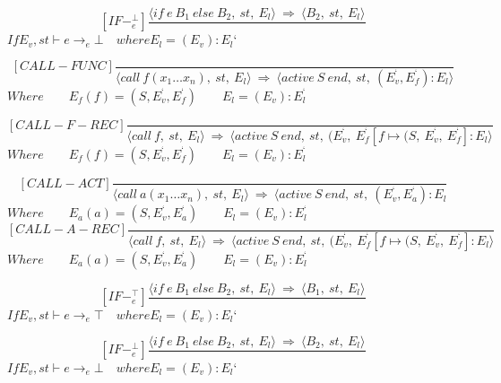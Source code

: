 	\[
	[IF-^{\bot}_e]
	\dfrac{\langle if \ e \ B_1 \ else \ B_2, \ st, \ E_l \rangle \ \Rightarrow \ \langle B_2, \ st, \ E_l \rangle}{}
	\]
	\begin{math}
		If E_v, st \vdash e \rightarrow_e \bot \quad where E_l = (E_v) : E_l{‘}
	\end{math}
	
	\[
	[CALL-FUNC]
	\dfrac{}{ \langle call \ f(x_1 … x_n), \ st, \ E_l \rangle \ \Rightarrow \ \langle active \ S \ end, \ st, \ (E_v^{‘}, E_f^{‘}) : E_l \rangle}
	\]
	\begin{math}
		Where 
		\qquad E_f(f) = (S, E_v^{‘}, E_f^{‘})
		\qquad E_l = (E_v) : E_l^{‘}
	\end{math}
	
	\[
	[CALL-F-REC]
	\dfrac{}{ \langle call \ f, \ st, \ E_l \rangle \ \Rightarrow \ \langle active \ S \ end, \ st, \ (E_v^{‘}, \ E_f^{‘}[f \mapsto (S, \ E_v^{‘}, \ E_f^{‘}] : E_l \rangle}
	\]
	\begin{math}
		Where
		\qquad E_f(f) = (S, E_v^{‘}, E_f^{‘}) 
		\qquad E_l = (E_v) : E_l^{‘}
	\end{math}
	
	\[
	[CALL-ACT]
	\dfrac{}{ \langle call \ a(x_1 … x_n), \ st, \ E_l \rangle \ \Rightarrow \ \langle active \ S \ end, \ st, \ (E_v^{‘}, E_a^{‘}) : E_l}
	\]
	\begin{math}
		Where
		\qquad E_a(a) = (S, E_v^{‘}, E_a^{‘})
		\qquad E_l = (E_v) : E_l^{‘}
	\end{math}
	\[
	[CALL-A-REC]
	\dfrac{}{ \langle call \ f, \ st, \ E_l \rangle \ \Rightarrow \ \langle active \ S \ end, \ st, \ (E_v^{‘}, \ E_f^{‘}[f \mapsto (S, \ E_v^{‘}, \ E_f^{‘}] : E_l \rangle}
	\]
	\begin{math}
		Where
		\qquad E_a(a) = (S, E_v^{‘}, E_a^{‘})
		\qquad E_l = (E_v) : E_l^{‘}		
	\end{math}
	
	\[
	[IF-^{\top}_e]
	\dfrac{\langle if \ e \ B_1 \ else \ B_2, \ st, \ E_l \rangle \ \Rightarrow \ \langle B_1, \ st, \ E_l \rangle}{}
	\]
	\begin{math}
		If E_v, st \vdash e \rightarrow_e \top \quad where E_l = (E_v) : E_l{‘}
	\end{math}
	
	\[
	[IF-^{\bot}_e]
	\dfrac{\langle if \ e \ B_1 \ else \ B_2, \ st, \ E_l \rangle \ \Rightarrow \ \langle B_2, \ st, \ E_l \rangle}{}
	\]
	\begin{math}
		If E_v, st \vdash e \rightarrow_e \bot \quad where E_l = (E_v) : E_l{‘}
	\end{math}
	
